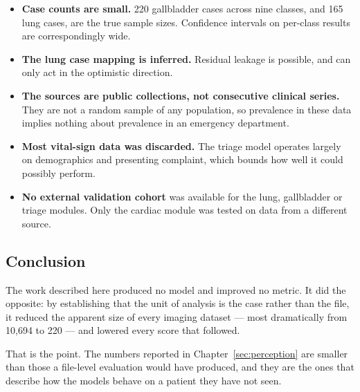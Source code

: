 \begin{itemize}[label=$\bullet$]
  \setlength\itemsep{0.2em}
  \item \textbf{Case counts are small.} 220 gallbladder cases across nine classes, and 165
    lung cases, are the true sample sizes. Confidence intervals on per-class results are
    correspondingly wide.
  \item \textbf{The lung case mapping is inferred.} Residual leakage is possible, and can
    only act in the optimistic direction.
  \item \textbf{The sources are public collections, not consecutive clinical series.} They
    are not a random sample of any population, so prevalence in these data implies nothing
    about prevalence in an emergency department.
  \item \textbf{Most vital-sign data was discarded.} The triage model operates largely on
    demographics and presenting complaint, which bounds how well it could possibly perform.
  \item \textbf{No external validation cohort} was available for the lung, gallbladder or
    triage modules. Only the cardiac module was tested on data from a different source.
\end{itemize}

\subsection{Conclusion}

The work described here produced no model and improved no metric. It did the opposite: by
establishing that the unit of analysis is the case rather than the file, it reduced the
apparent size of every imaging dataset --- most dramatically from 10{,}694 to 220 --- and
lowered every score that followed.

That is the point. The numbers reported in Chapter~\ref{sec:perception} are smaller than
those a file-level evaluation would have produced, and they are the ones that describe how
the models behave on a patient they have not seen.
